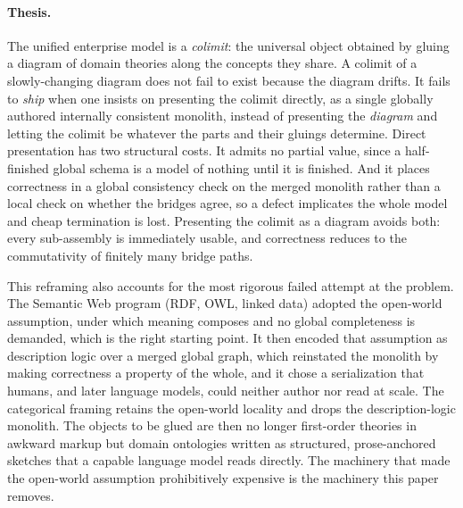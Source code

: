 \documentclass[11pt]{article}
\theoremstyle{plain}
\theoremstyle{definition}
\begin{document}
\paragraph{Thesis.} The unified enterprise model is a \emph{colimit}: the universal object obtained by gluing a diagram of domain theories along the concepts they share. A colimit of a slowly-changing diagram does not fail to exist because the diagram drifts. It fails to \emph{ship} when one insists on presenting the colimit directly, as a single globally authored internally consistent monolith, instead of presenting the \emph{diagram} and letting the colimit be whatever the parts and their gluings determine. Direct presentation has two structural costs. It admits no partial value, since a half-finished global schema is a model of nothing until it is finished. And it places correctness in a global consistency check on the merged monolith rather than a local check on whether the bridges agree, so a defect implicates the whole model and cheap termination is lost. Presenting the colimit as a diagram avoids both: every sub-assembly is immediately usable, and correctness reduces to the commutativity of finitely many bridge paths.

This reframing also accounts for the most rigorous failed attempt at the problem. The Semantic Web program (RDF, OWL, linked data) adopted the open-world assumption, under which meaning composes and no global completeness is demanded, which is the right starting point. It then encoded that assumption as description logic over a merged global graph, which reinstated the monolith by making correctness a property of the whole, and it chose a serialization that humans, and later language models, could neither author nor read at scale. The categorical framing retains the open-world locality and drops the description-logic monolith. The objects to be glued are then no longer first-order theories in awkward markup but domain ontologies written as structured, prose-anchored sketches that a capable language model reads directly. The machinery that made the open-world assumption prohibitively expensive is the machinery this paper removes.
\end{document}
